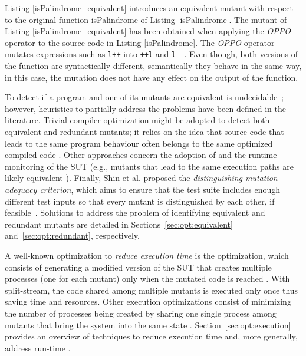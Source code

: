


Listing \ref{isPalindrome_equivalent} introduces an equivalent mutant with respect to the original function isPalindrome of Listing \ref{isPalindrome}. The mutant of Listing \ref{isPalindrome_equivalent} has been obtained when applying the \textit{OPPO} operator to the source code in Listing \ref{isPalindrome}. The \textit{OPPO} operator mutates expressions such as \texttt{l++} into \texttt{++l} and \texttt{l-}\texttt{-}.
Even though, both versions of the function are syntactically different, semantically they behave in the same way, in this case, the mutation does not have any effect on the output of the function.

To detect if a program and one of its mutants are
equivalent is undecidable~\cite{Budd:1982}; however, heuristics to partially address the problems have been defined in the literature.
Trivial compiler optimization might be adopted to detect both equivalent and redundant mutants; it relies on the idea that source code that leads to the same program behaviour often belongs to the same optimized compiled code \cite{papadakis2015trivial}. Other approaches concern the adoption of  \cite{papadakis2012mutation,kurtz2015static} and the runtime monitoring of the SUT (e.g., mutants that lead to the same execution paths are likely equivalent \cite{schuler2013covering}). Finally, Shin et al. proposed the \emph{distinguishing mutation adequacy criterion}, which aims to ensure that the test suite includes enough different test inputs so that every mutant is distinguished by each other, if feasible~\cite{shin2017theoretical}. 
Solutions to address the problem of identifying equivalent and redundant mutants are detailed in Sections~\ref{sec:opt:equivalent} and~\ref{sec:opt:redundant}, respectively.


A well-known optimization to \emph{reduce execution time} is the  optimization, which consists of generating a modified version of the SUT that creates multiple processes (one for each mutant) only when the mutated code is reached \cite{tokumoto2016muvm}. With split-stream, the code shared among multiple mutants is executed only once thus saving time and resources. Other execution optimizations consist of minimizing the number of processes being created by sharing one single process among mutants that bring the system into the same state \cite{wang2017faster}.
Section~\ref{sec:opt:execution} provides an overview of techniques to reduce execution time and, more generally, address run-time .

